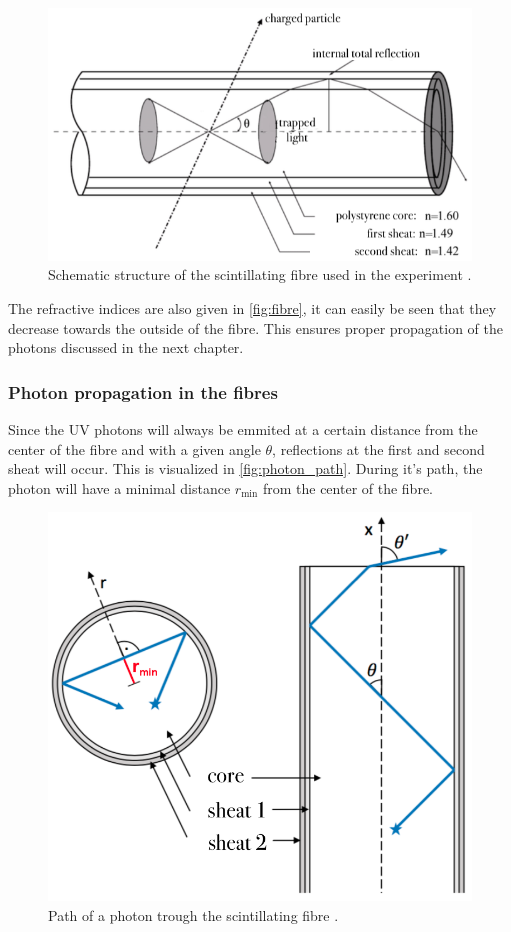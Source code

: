 \begin{figure}[H]
	\centering
	\includegraphics[width=0.7\linewidth]{pics/fibre.png}
	\caption{Schematic structure of the scintillating fibre used in the experiment \cite{SciFi}.}
	\label{fig:fibre}
\end{figure}

The refractive indices are also given in \autoref{fig:fibre}, it can easily be seen that they decrease towards the outside
of the fibre. This ensures proper propagation of the photons discussed in the next chapter.

\subsubsection{Photon propagation in the fibres}

Since the UV photons will always be emmited at a certain distance from the center of the fibre and with a given angle $\theta$,
reflections at the first and second sheat will occur. This is visualized in \autoref{fig:photon_path}.
During it's path, the photon will have a minimal distance $r_\mathrm{min}$ from the center of the fibre.

\begin{figure}[H]
	\centering
	\includegraphics[width=0.5\linewidth]{pics/photon_path.png}
	\caption{Path of a photon trough the scintillating fibre \cite{SciFi}.}
	\label{fig:photon_path}
\end{figure}

